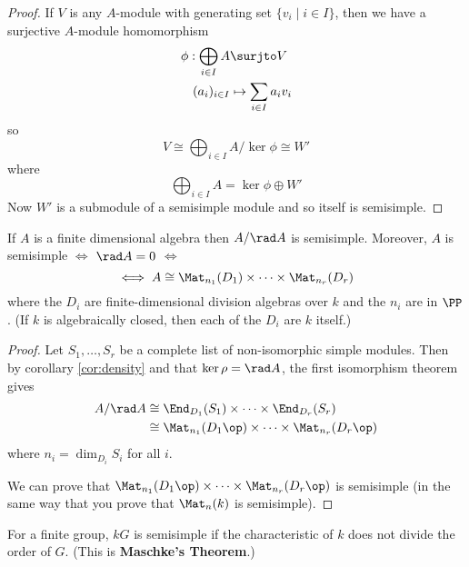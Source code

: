 \begin{proof}
	If $V$ is any $A$-module with generating set $\{v_i \mid i \in I\}$, then we have a surjective $A$-module homomorphism
    \begin{align*}
   		\phi: \bigoplus_{i \in I} A &\surjto V \\
        (a_i)_{i \in I} &\mapsto \sum_{i \in I} a_iv_i
    \end{align*}
    so
    \[V \cong \bigoplus_{i \in I} A/\ker\phi \cong W'\]
    where
    \[\bigoplus_{i \in I} A = \ker\phi \oplus W'\]
    Now $W'$ is a submodule of a semisimple module and so itself is semisimple.
\end{proof}

\begin{thm}
	If $A$ is a finite dimensional algebra then $A/\rad A$ is semisimple.
    Moreover, $A$ is semisimple $\iff$ $\rad A = 0$ $\iff$
    \[\iff A \cong \Mat_{n_1}(D_1) \times \cdots \times \Mat_{n_r}(D_r)\]
    where the $D_i$ are finite-dimensional division algebras over $k$ and the $n_i$ are in $\PP$.
    (If $k$ is algebraically closed, then each of the $D_i$ are $k$ itself.)
\end{thm}

\begin{proof}
	Let $S_1,\ldots,S_r$ be a complete list of non-isomorphic simple modules.
    Then by corollary \ref{cor:density} and that $\ker\rho = \rad A$, the first isomorphism theorem gives
    \begin{align*}
    	A/\rad A &\cong \End_{D_1}(S_1) \times \cdots \times \End_{D_r}(S_r) \\
        &\cong \Mat_{n_1}(D_1\op) \times \cdots \times \Mat_{n_r}(D_r\op)
    \end{align*}
    where $n_i = \dim_{D_i} S_i$ for all $i$.

	We can prove that $\Mat_{n_1}(D_1\op) \times \cdots \times \Mat_{n_r}(D_r\op)$ is semisimple (in the same way that you prove that $\Mat_n(k)$ is semisimple).
\end{proof}

\begin{rmk}
	For a finite group, $kG$ is semisimple if the characteristic of $k$ does not divide the order of $G$.
    (This is \textbf{Maschke's Theorem}.)
\end{rmk}